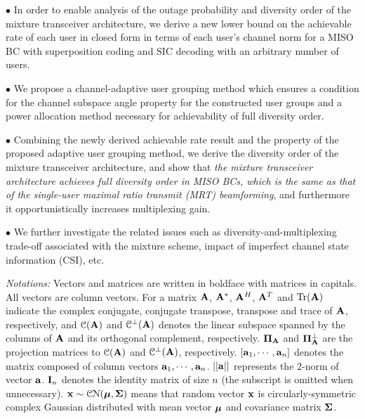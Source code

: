 \documentclass[11pt, draft, onecolumn ]{IEEEtran}
\begin{document}
\noindent $\bullet$ {In order to enable analysis of
 the outage probability and diversity order of the  mixture transceiver architecture,  we derive a new  lower bound on the achievable rate of each user in closed form in terms of each user's channel norm for a  MISO BC with superposition coding and  SIC decoding with an arbitrary number of users.}


\noindent $\bullet$ {We propose a channel-adaptive user grouping method which ensures a condition for the channel subspace angle property for the constructed user groups and a  power allocation method necessary for achievability of full diversity order.}

\noindent $\bullet$  {Combining the newly derived  achievable rate result and the property of the proposed adaptive  user grouping method, we derive the diversity order of the mixture transceiver architecture, and show that  {\em the mixture transceiver architecture achieves  full diversity order in MISO BCs, which is the same as that of the single-user maximal ratio transmit (MRT) beamforming}, and furthermore it  opportunistically increases multiplexing gain.}

\noindent $\bullet$ {We further investigate the related issues such as diversity-and-multiplexing trade-off associated with the mixture scheme, impact of imperfect channel state information (CSI), etc.}











\textit{Notations:}  Vectors and matrices are written in boldface
with matrices in capitals. All vectors are column vectors. For a
matrix ${\bf A}$, ${\bf A}^*$, ${\bf A}^H$, ${\bf A}^T$ and $\mbox{Tr}({\bf A})$ indicate the
complex conjugate, conjugate transpose,   transpose and trace of ${\bf A}$,
respectively, and  ${\cal C}({\bf A})$ and ${\cal C}^\perp({\bf A})$ denotes the
linear subspace spanned by the columns of ${\bf A}$ and its orthogonal
complement, respectively.
 ${\bf \Pi}_{\bf A}$ and
${\bf \Pi}_{\bf A}^\bot$ are the projection matrices to ${\cal C}({\bf A})$ and
${\cal C}^\perp({\bf A})$,
 respectively.
 $[{\bf a}_1,\cdots,{\bf a}_n]$ denotes the matrix composed of column vectors ${\bf a}_1,\cdots,{\bf a}_n$.
 $||{\bf a}||$ represents the 2-norm of vector ${\bf a}$. ${\bf I}_n$ denotes the identity matrix of size $n$ (the subscript is omitted when unnecessary).
${\bf x}\sim{\cal C}{\cal N}(\hbox{\boldmath$\mu$\unboldmath},\hbox{$\bf \Sigma$})$ means that random vector ${\bf x}$ is
circularly-symmetric complex Gaussian distributed with mean vector
$\hbox{\boldmath$\mu$\unboldmath}$ and covariance matrix $\hbox{$\bf \Sigma$}$.
\end{document}
